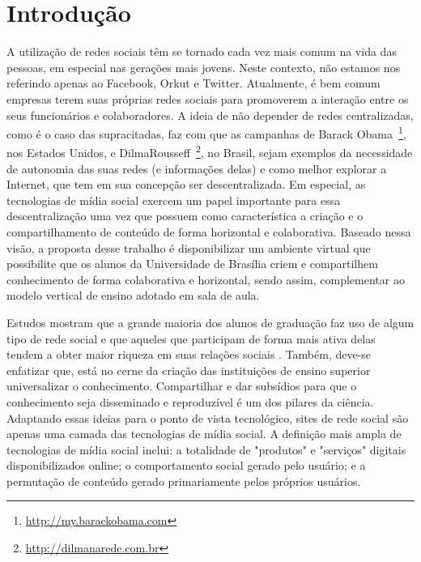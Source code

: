 \chapter{Introdução}

A utilização de redes sociais têm se tornado cada vez mais comum na vida das
pessoas, em especial nas gerações mais jovens. Neste contexto, não estamos nos
referindo apenas ao Facebook, Orkut e Twitter. 
%
Atualmente, é bem comum empresas terem suas próprias redes sociais para
promoverem a interação entre os seus funcionários e colaboradores. A ideia de
não depender de redes centralizadas, como é o caso das supracitadas, faz com que
as campanhas de Barack Obama~\footnote{\url{http://my.barackobama.com}}, nos
Estados Unidos, e DilmaRousseff~\footnote{\url{http://dilmanarede.com.br}}, no
Brasil, sejam exemplos da necessidade de autonomia das suas redes
(e informações delas) e como melhor explorar a Internet, que tem em sua
concepção ser descentralizada. 
%
Em especial, as tecnologias de mídia social exercem um papel importante para 
essa descentralização uma vez que possuem como característica a criação e o
compartilhamento de conteúdo de forma horizontal e colaborativa. 
%
Baseado nessa visão, a proposta desse trabalho é disponibilizar um ambiente
virtual que possibilite que os alunos da Universidade de Brasília criem e
compartilhem conhecimento de forma colaborativa e horizontal, sendo assim,
complementar ao modelo vertical de ensino adotado em sala de aula.

Estudos mostram que a grande maioria dos alunos de graduação faz uso de algum
tipo de rede social e que aqueles que participam de forma mais ativa delas
tendem a obter maior riqueza em suas relações sociais . 
%
Também, deve-se enfatizar que, está no cerne da criação das instituições de
ensino superior universalizar o conhecimento. Compartilhar e dar subsídios para
que o conhecimento seja disseminado e reproduzível é um dos pilares da ciência.
%
Adaptando essas ideias para o ponto de vista tecnológico, sites de rede social
são apenas uma camada das tecnologias de mídia social. A definição mais ampla de
tecnologias de mídia social inclui: a totalidade de "produtos" e "serviços"
digitais disponibilizados online; o comportamento social gerado pelo usuário; e
a permutação de conteúdo gerado primariamente pelos próprios usuários.



